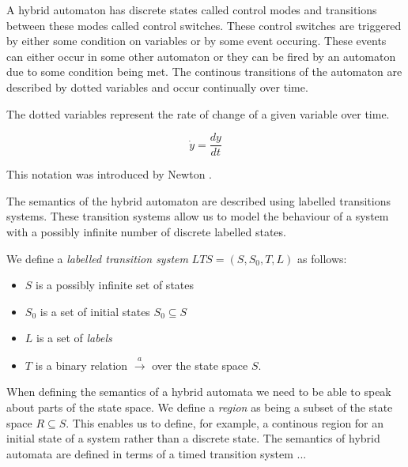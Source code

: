 \medskip
A hybrid automaton has discrete states called control modes and transitions between these modes called control switches. These control switches are triggered by either some condition on variables or by some event occuring. These events can either occur in some other automaton or they can be fired by an automaton due to some condition being met. The continous transitions of the automaton are described by dotted variables and occur continually over time.
\medskip
\begin{myremark}
The dotted variables represent the rate of change of a given variable over time.

$$\dot{y} = \frac{dy}{dt}$$

This notation was introduced by Newton \cite{CF28}.
\end{myremark}
\medskip
The semantics of the hybrid automaton are described using labelled transitions systems. These transition systems allow us to model the behaviour of a system with a possibly infinite number of discrete labelled states. 
\medskip
\begin{mydef}
We define a \emph{labelled transition system} $LTS = (S,S_0,T,L)$ as follows:
\begin{itemize}

\item $S$ is a possibly infinite set of states

\item $S_0$ is a set of initial states $S_0 \subseteq S$

\item $L$ is a set of \emph{labels}

\item $T$ is a binary relation $\xrightarrow{a}$ over the state space $S$.

\end{itemize}
\end{mydef}
\medskip
When defining the semantics of a hybrid automata we need to be able to speak about parts of the state space.  We define a \emph{region} as being a subset of the state space $R \subseteq S$.  This enables us to define, for example, a continous region for an initial state of a system rather than a discrete state. The semantics of hybrid automata are defined in terms of a timed transition system ...


